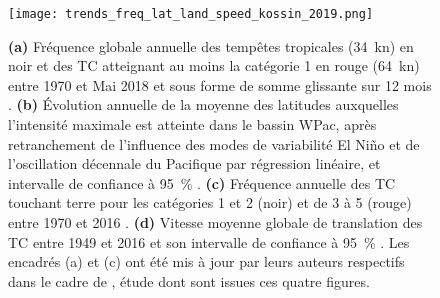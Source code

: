 \documentclass[../main.tex]{subfiles}
\begin{document}
\begin{figure}[tb]
    \centering
    \texttt{[image: trends\_freq\_lat\_land\_speed\_kossin\_2019.png]}
    \caption{\textbf{(a)} Fréquence globale annuelle des tempêtes tropicales (\SI{34}{\knot}) en noir et des TC atteignant au moins la catégorie 1 en rouge
        (\SI{64}{\knot}) entre 1970 et Mai 2018 et sous forme de somme glissante sur 12 mois \parencite{maue_recent_2011}. \textbf{(b)} Évolution annuelle de la
        moyenne des latitudes auxquelles l'intensité maximale est atteinte dans le bassin WPac, après retranchement de l'influence des modes de variabilité El Niño et de
        l'oscillation décennale du Pacifique par régression linéaire, et intervalle de confiance à \SI{95}{\percent} \parencite{kossin_comment_2018}. \textbf{(c)}
        Fréquence annuelle des TC touchant terre pour les catégories \num{1} et \num{2} (noir) et de \num{3} à \num{5} (rouge) entre 1970 et 2016
        \parencite{weinkle_historical_2012}. \textbf{(d)} Vitesse moyenne globale de translation des TC entre 1949 et 2016 et son intervalle de confiance à
        \SI{95}{\percent} \hbox{\parencite{kossin_global_2018}}. Les encadrés (a) et (c) ont été mis à jour par leurs auteurs respectifs dans le cadre de
        \cite{knutson_tropical_2019}, étude dont sont issues ces quatre figures.}
    \label{fig:observed_trends_other}
\end{figure}
\end{document}
